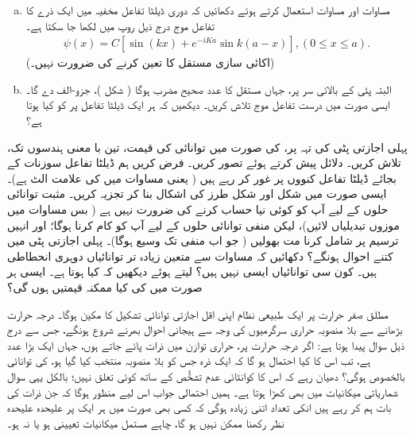 \begin{enumerate}[a.]
\item
 مساوات  اور مساوات  استعمال کرتے ہوئے دکھائیں کہ دوری ڈیلٹا تفاعل مخفیہ میں ایک ذرے کا تفاعل موج درج ذیل روپ میں لکھا جا سکتا ہے۔
\begin{align*}
	\psi(x) = C[\sin(kx)+e^{-iKa}\sin k(a-x)], (0\leq x\leq a).
\end{align*} 
(اکائی سازی مستقل  کا تعین کرنے کی ضرورت نہیں۔)
\item
 البتہ پٹی کے بالائی سر پر، جہاں  مستقل  کا عدد صحیح مضرب ہوگا ( شکل )، جزو-الف  دے گا۔ ایسی صورت میں درست تفاعل موج تلاش کریں۔ دیکھیں کہ ہر ایک ڈیلٹا تفاعل پر  کو کیا ہوتا ہے؟
\end{enumerate}
پہلی اجازتی پٹی کی تہہ پر،  کی صورت میں توانائی کی قیمت، تین با معنی ہندسوں تک، تلاش کریں۔ دلائل پیش کرتے ہوئے  تصور کریں۔
فرض کریں ہم ڈیلٹا تفاعل سوزنات کے بجائے ڈیلٹا تفاعل کنووں پر غور کر رہے ہیں ( یعنی مساوات  میں  کی علامت الٹ ہے)۔ ایسی صورت میں
 شکل  اور شکل  طرز کی اشکال بنا کر تجزیہ کریں۔ مثبت توانائی حلوں کے لیے آپ کو کوئی نیا حساب کرنے کی ضرورت نہیں ہے ( بس مساوات  میں موزوں تبدیلیاں لائیں)، لیکن منفی توانائی حلوں کے لیے آپ کو کام کرنا ہوگا؛ اور انہیں ترسیم پر شامل کرنا مت بھولیں ( جو اب منفی  تک وسیع ہوگا)۔ پہلی اجازتی پٹی میں کتنے احوال ہونگے؟
دکھائیں کہ مساوات  سے متعین زیادہ تر توانائیاں دوہری انحطاطی ہیں۔ کون سی توانائیاں ایسی نہیں ہیں؟   لیتے ہوئے دیکھیں کہ کیا ہوتا ہے۔ ایسی ہر صورت میں  کی کیا ممکنہ قیمتیں ہوں گی؟


مطلق صفر حرارت پر ایک طبیعی نظام اپنی اقل اجازتی توانائی تشکیل کا مکین ہوگا۔ درجہ حرارت بڑھانے سے بلا منصوبہ حراری سرگرمیوں کی وجہ سے ہیجانی احوال بھرنے شروع ہونگے، جس سے درج ذیل سوال پیدا ہوتا ہے: اگر درجہ حرارت  پر، حراری توازن میں  ذرات پائے جاتے ہوں، جہاں  ایک بڑا عدد ہے، تب اس کا کیا احتمال ہو گا کہ ایک ذرہ جس کو بلا منصوبہ منتخب کیا گیا ہو، کی توانائی بالخصوص  ہوگی؟ دھیان رہے کہ اس کا کوانٹائی عدم تشخُّص کے ساتھ کوئی تعلق نہیں؛ بالکل یہی سوال  شماریاتی میکانیات میں بھی کھڑا ہوتا ہے۔ ہمیں احتمالی جواب اس لیے منظور ہوگا کہ جن ذرات کی بات ہم کر رہے ہیں انکی تعداد اتنی زیادہ ہوگی کہ کسی بھی صورت میں ہر ایک پر علیحدہ علیحدہ نظر رکھنا ممکن نہیں ہو گا، چاہے مستمل میکانیات تعیینی ہو یا نہ ہو۔

